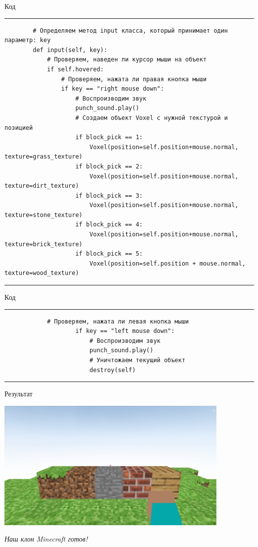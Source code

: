 \documentclass[handout]{beamer}
\begin{document}
    \begin{frame}[fragile]{Код}
        \scriptsize
        \rule{\textwidth}{1pt}
        \begin{verbatim}
        # Определяем метод input класса, который принимает один параметр: key
        def input(self, key):
            # Проверяем, наведен ли курсор мыши на объект
            if self.hovered:
                # Проверяем, нажата ли правая кнопка мыши
                if key == "right mouse down":
                    # Воспроизводим звук
                    punch_sound.play()
                    # Создаем объект Voxel с нужной текстурой и позицией
                    if block_pick == 1:
                        Voxel(position=self.position+mouse.normal, texture=grass_texture)
                    if block_pick == 2:
                        Voxel(position=self.position+mouse.normal, texture=dirt_texture)
                    if block_pick == 3:
                        Voxel(position=self.position+mouse.normal, texture=stone_texture)
                    if block_pick == 4:
                        Voxel(position=self.position+mouse.normal, texture=brick_texture)
                    if block_pick == 5:
                        Voxel(position=self.position + mouse.normal, texture=wood_texture)
        \end{verbatim}
        \rule{\textwidth}{1pt}
    \end{frame}

    \begin{frame}[fragile]{Код}
        \scriptsize
        \rule{\textwidth}{1pt}
        \begin{verbatim}
            # Проверяем, нажата ли левая кнопка мыши
                    if key == "left mouse down":
                        # Воспроизводим звук
                        punch_sound.play()
                        # Уничтожаем текущий объект
                        destroy(self)
        \end{verbatim}
        \rule{\textwidth}{1pt}
    \end{frame}

    \begin{frame}{Результат}
        \begin{center}
            \includegraphics[width=0.85\textwidth]{img/9.png} \\
            \begin{justify}
                \textit{Наш клон Minecraft готов!}
            \end{justify}
        \end{center}
    \end{frame}
\end{document}
